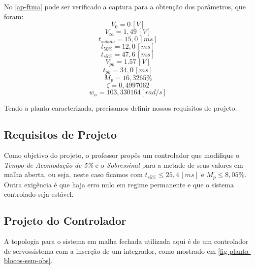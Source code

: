 \documentclass[
	12pt,				%
	article,			%
	openright,			%
	oneside,
	a4paper,			%
	chapter=TITLE,		%
	section=TITLE,		%
	english,			%
	french,				%
	spanish,			%
	brazil,				%
]{abntex2}
\begin{document}
            No \ref{ap-ftma} pode ser verificado a captura para a obtenção dos parâmetros, que foram:
            \FloatBarrier
                $$V_{0}=0\,[V]$$
                $$V_{\infty}=1,49\,[V]$$
                $$t_{subida}=15,0\,[ms]$$
                $$t_{50\%}=12,0\,[ms]$$
                $$t_{s5\%}=47,6\,[ms]$$
                $$V_{pk}=1.57\,[V]$$
                $$t_{pk}=34,0\,[ms]$$
                $$M_{p}=16,3265\%$$
                $$\zeta = 0,4997062 $$
                $$w_n = 103,330164 [rad/s]$$
            \FloatBarrier
            
            Tendo a planta caracterizada, precisamos definir nossos requisitos de projeto.
        
        \subsection{Requisitos de Projeto}
        
            Como objetivo do projeto, o professor propôs um controlador que modifique o \textit{Tempo de Acomodação de 5\%} e o \textit{Sobressinal} para a metade de seus valores em malha aberta, ou seja, neste caso ficamos com $t_{s5\%}\leq25,4\,[ms]$ e $M_{p}\leq8,05\%$. Outra exigência é que haja erro nulo em regime permanente e que o sistema controlado seja estável.

        \subsection{Projeto do Controlador}
        
            A topologia para o sistema em malha fechada utilizada aqui é de um controlador de servossistema com a inserção de um integrador, como mostrado em \autoref{fig-planta-blocos-sem-obs}.
            
\end{document}
